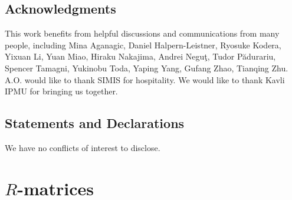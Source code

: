 \documentclass[10pt]{amsart}
\theoremstyle{definition}
\numberwithin{equation}{section}
\newcommand{\C}{\mathbb{C}}
\newcommand{\Hilb}{\operatorname{Hilb}}
\newcommand{\yc}[1]{\textcolor{blue}{  #1 }}
\begin{document}




\subsection*{Acknowledgments}
This work benefits from helpful discussions and communications from many people, including
Mina Aganagic, Daniel Halpern-Leistner, Ryosuke Kodera, Yixuan Li, Yuan Miao, Hiraku Nakajima, Andrei Negu\c{t}, Tudor P\u{a}durariu, Spencer Tamagni, Yukinobu Toda, Yaping Yang, Gufang Zhao, Tianqing Zhu. A.O. would like to thank SIMIS for hospitality. We would like to thank Kavli IPMU for bringing us together.


\subsection*{Statements and Declarations}
We have no conflicts of interest to disclose.

\vspace{1cm}



\section{\texorpdfstring{$R$}{R}-matrices}\label{sect on rmatrix}
\end{document}
